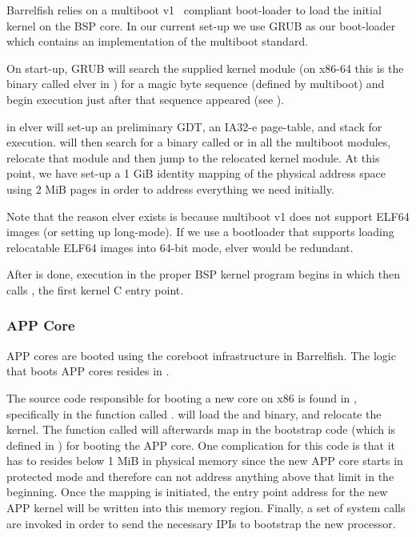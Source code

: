 \documentclass[a4paper,11pt,twoside]{report}
\begin{document}
{{Barrelfish relies on a multiboot v1~\cite{multiboot1} compliant boot-loader to
load the initial kernel on the BSP core. In our current set-up we use GRUB as
our boot-loader which contains an implementation of the multiboot standard.

On start-up, GRUB will search the supplied kernel module (on x86-64 this is the
binary called elver in ) for a magic byte sequence
(defined by multiboot) and begin execution just after that sequence appeared
(see ).

 in elver will set-up an preliminary GDT, an IA32-e page-table,
and stack for execution.  will then search for a
binary called  or  in all the multiboot
modules, relocate that module and then jump to the relocated kernel module. At
this point, we have set-up a 1 GiB identity mapping of the physical address
space using 2 MiB  pages in order to address everything we need initially.

Note that the reason elver exists is because multiboot v1 does not support
ELF64 images (or setting up long-mode). If we use a bootloader that supports
loading relocatable ELF64 images into 64-bit mode, elver would be redundant.

After  is done, execution in the proper BSP kernel program
begins in  which then calls
, the first kernel C entry point.

\subsubsection{APP Core}

APP cores are booted using the coreboot infrastructure in Barrelfish. The
logic that boots APP cores resides in .

The source code responsible for booting a new core on x86 is found in
, specifically in the function called
.  will load the
 and  binary, and relocate the kernel. The
function called  will afterwards map in the
bootstrap code (which is defined in ) for booting the
APP core. One complication for this code is that it has to resides below 1 MiB
in physical memory since the new APP core starts in protected mode and
therefore can not address anything above that limit in the beginning. Once the
mapping is initiated, the entry point address for the new APP kernel will be
written into this memory region. Finally, a set of system calls are invoked
in order to send the necessary IPIs to bootstrap the new processor.

}}
\end{document}
